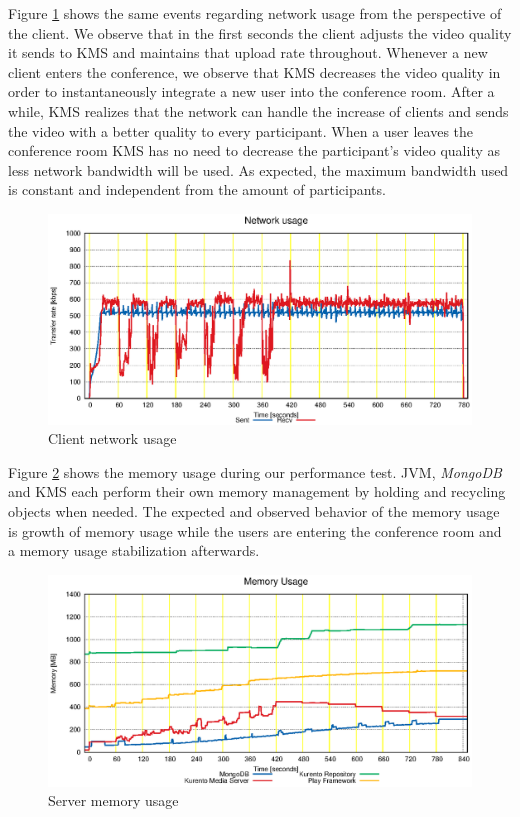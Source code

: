 \documentclass[10pt,conference]{IEEEtran}
\begin{document}
Figure \ref{fig:test_client_net} shows the same events regarding network usage from the perspective of the client.
We observe that in the first seconds the client adjusts the video quality it sends to \gls{KMS} and maintains that upload rate throughout.
Whenever a new client enters the conference, we observe that \gls{KMS} decreases the video quality in order to instantaneously integrate a new user into the conference room.
After a while, \gls{KMS} realizes that the network can handle the increase of clients and sends the video with a better quality to every participant.
When a user leaves the conference room \gls{KMS} has no need to decrease the participant's video quality as less network bandwidth will be used.
As expected, the maximum bandwidth used is constant and independent from the amount of participants.

\begin{figure}
  \centering
  \includegraphics[width=\linewidth]{stats/test_client_net.eps}
  \caption{Client network usage}
  \label{fig:test_client_net}
\end{figure}

Figure \ref{fig:test_ram_fixed_mem} shows the memory usage during our performance test.
\gls{JVM}, \emph{MongoDB} and \gls{KMS} each perform their own memory management by holding and recycling objects when needed.
The expected and observed behavior of the memory usage is growth of memory usage while the users are entering the conference room and a memory usage stabilization afterwards.


\begin{figure}
  \centering
  \includegraphics[width=\linewidth]{stats/test_ram_fixed_mem.eps}
  \caption{Server memory usage}
  \label{fig:test_ram_fixed_mem}
\end{figure}
\end{document}
